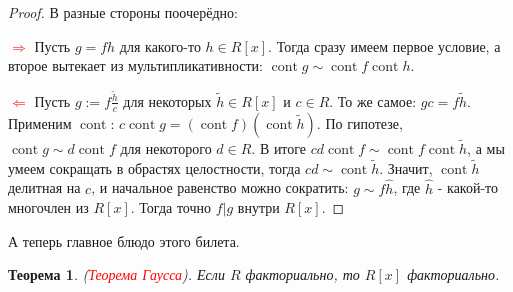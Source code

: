 \documentclass[a4paper,100pt]{article}
\theoremstyle{indented}
\newtheorem{theorem}{Теорема}
\theoremstyle{definition}
\theoremstyle{remark}
\DeclareMathOperator{\cont}{cont}
\begin{document}
\begin{proof}
    В разные стороны поочерёдно:\ 

    \textcolor{red}{$\Rightarrow$} Пусть $g=fh$ для какого-то $h\in R[x]$. Тогда сразу имеем первое условие, а второе вытекает из мультипликативности: $\cont g\sim \cont f\cont h$.\ 

    \textcolor{red}{$\Leftarrow$} Пусть $g:=f\frac{\tilde{h}}{c}$ для некоторых $\tilde{h}\in R[x]$ и $c\in R$. То же самое: $gc=f\tilde{h}$. Применим $\cont$: $c \cont g = (\cont f)(\cont \tilde{h})$. По гипотезе, $\cont g\sim d\cont f$ для некоторого $d\in R$. В итоге $cd\cont f\sim \cont f\cont \tilde{h}$, а мы умеем сокращать в обрастях целостности, тогда $cd\sim \cont \tilde{h}$. Значит, $\cont \tilde{h}$ делитная на $c$, и начальное равенство можно сократить: $g\sim f\hat{h}$, где $\hat{h}$ - какой-то многочлен из $R[x]$. Тогда точно $f\vert g$ внутри $R[x]$.
\end{proof}

А теперь главное блюдо этого билета.\\

\begin{theorem}
    (\hypertarget{n32}{\textcolor{red}{\textit{Теорема Гаусса}}}). Если $R$ факториально, то $R[x]$ факториально.
\end{theorem}
\end{document}
